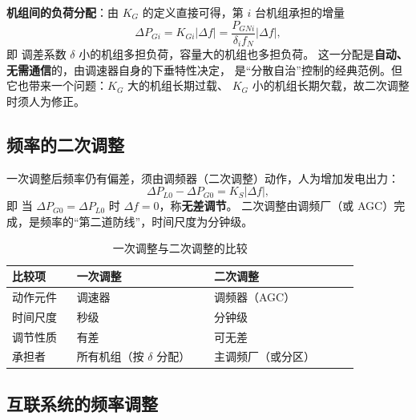\textbf{机组间的负荷分配}：由 $K_G$ 的定义直接可得，第 $i$ 台机组承担的增量
\begin{equation}
  \Delta P_{Gi}=K_{Gi}\left|\Delta f\right|
  =\frac{P_{GNi}}{\delta_i f_N}\left|\Delta f\right|,
\end{equation}
即
调差系数 $\delta$ 小的机组多担负荷，容量大的机组也多担负荷。
这一分配是\textbf{自动、无需通信}的，由调速器自身的下垂特性决定，
是“分散自治”控制的经典范例。但它也带来一个问题：$K_G$ 大的机组长期过载、
$K_G$ 小的机组长期欠载，故二次调整时须人为修正。

\subsection{频率的二次调整}

一次调整后频率仍有偏差，须由调频器（二次调整）动作，人为增加发电出力：
\begin{equation}
  \Delta P_{L0}-\Delta P_{G0}=K_S\left|\Delta f\right|,
\end{equation}
即
当 $\Delta P_{G0}=\Delta P_{L0}$ 时 $\Delta f=0$，称\textbf{无差调节}。
二次调整由调频厂（或 AGC）完成，是频率的“第二道防线”，时间尺度为分钟级。

\begin{table}[htbp]
  \centering
  \caption{一次调整与二次调整的比较}
  \small
  \begin{tabular}{@{}p{0.16\linewidth}p{0.34\linewidth}p{0.36\linewidth}@{}}
    \toprule
    比较项 & 一次调整 & 二次调整 \\
    \midrule
    动作元件 & 调速器 & 调频器（AGC） \\
    时间尺度 & 秒级 & 分钟级 \\
    调节性质 & 有差 & 可无差 \\
    承担者 & 所有机组（按 $\delta$ 分配） & 主调频厂（或分区） \\
    \bottomrule
  \end{tabular}
\end{table}

\subsection{互联系统的频率调整}

